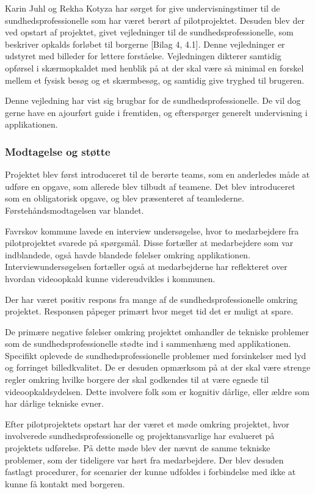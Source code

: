 Karin Juhl og Rekha Kotyza har sørget for give undervisningstimer til de sundhedsprofessionelle som har været berørt af pilotprojektet. Desuden blev der ved opstart af projektet, givet vejledninger til de sundhedsprofessionelle, som beskriver opkalds forløbet til borgerne [Bilag 4, 4.1]. Denne vejledninger er udstyret med billeder for lettere forståelse. Vejledningen dikterer samtidig opførsel i skærmopkaldet med henblik på at der skal være så minimal en forskel mellem et fysisk besøg og et skærmbesøg, og samtidig give tryghed til brugeren.

Denne vejledning har vist sig brugbar for de sundhedsprofessionelle. De vil dog gerne have en ajourført guide i fremtiden, og efterspørger generelt undervisning i applikationen.

 
\subsubsection{Modtagelse og støtte}
Projektet blev først introduceret til de berørte teams, som en anderledes måde at udføre en opgave, som allerede blev tilbudt af teamene. Det blev introduceret som en obligatorisk opgave, og blev præsenteret af teamlederne. Førstehåndsmodtagelsen var blandet. 

Favrskov kommune lavede en interview undersøgelse, hvor to medarbejdere fra pilotprojektet svarede på spørgsmål. Disse fortæller at medarbejdere som var indblandede, også havde blandede følelser omkring applikationen. Interviewundersøgelsen fortæller også at medarbejderne har reflekteret over hvordan videoopkald kunne videreudvikles i kommunen. 

Der har været positiv respons fra mange af de sundhedsprofessionelle omkring projektet. Responsen påpeger primært hvor meget tid det er muligt at spare.

De primære negative følelser omkring projektet omhandler de tekniske problemer som de sundhedsprofessionelle stødte ind i sammenhæng med applikationen. Specifikt oplevede de sundhedsprofessionelle problemer med forsinkelser med lyd og forringet billedkvalitet. De er desuden opmærksom på at der skal være strenge regler omkring hvilke borgere der skal godkendes til at være egnede til videoopkaldsydelsen. Dette involvere folk som er kognitiv dårlige, eller ældre som har dårlige tekniske evner. 

Efter pilotprojektets opstart har der været et møde omkring projektet, hvor involverede sundhedsprofessionelle og projektansvarlige har evalueret på projektets udførelse. På dette møde blev der nævnt de samme tekniske problemer, som der tideligere var hørt fra medarbejdere. Der blev desuden fastlagt procedurer, for scenarier der kunne udfoldes i forbindelse med ikke at kunne få kontakt med borgeren. 


